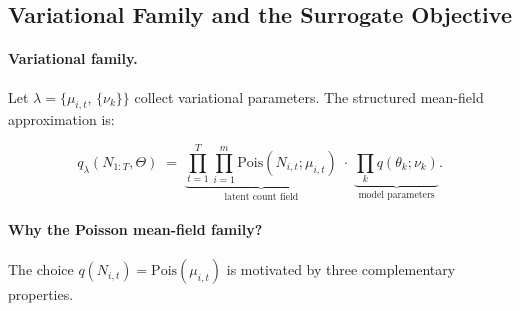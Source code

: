\documentclass[review,12pt]{elsarticle}
\theoremstyle{definition}
\begin{document}
\subsection{Variational Family and the Surrogate Objective}
\label{sec:vi-family}

\paragraph{Variational family.}
Let $\lambda = \{\mu_{i,t},\,\{\nu_k\}\}$ collect variational parameters.
The structured mean-field approximation is:

\begin{equation}\label{eq:mf}
q_\lambda(N_{1:T},\Theta)
\;=\;
\underbrace{\prod_{t=1}^T\prod_{i=1}^m \mathrm{Pois}(N_{i,t};\mu_{i,t})}_{\text{latent count field}}
\;\cdot\;
\underbrace{\prod_k q(\theta_k;\nu_k)}_{\text{model parameters}}.
\end{equation}

\paragraph{Why the Poisson mean-field family?}
The choice $q(N_{i,t})=\mathrm{Pois}(\mu_{i,t})$ is motivated by three
complementary properties.
\end{document}
